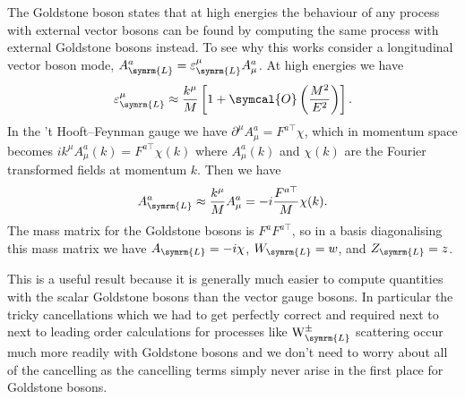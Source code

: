 \documentclass[fleqn]{NotesClass}
\newcommand{\Pparticle}[1]{\mathrm{#1}}
\newcommand{\PWpm}{\ensuremath{\Pparticle{W}^{\pm}}}
\newcommand{\order}{\symcal{O}}
\newcommand{\trans}{\top}
\begin{document}
    The Goldstone boson  states that at high energies the behaviour of any process with external vector bosons can be found by computing the same process with external Goldstone bosons instead.
    To see why this works consider a longitudinal vector boson mode, \(A^a_{\symrm{L}} = \varepsilon^\mu_{\symrm{L}} A^a_\mu\).
    At high energies we have 
    \begin{equation}
        \varepsilon^\mu_{\symrm{L}} \approx \frac{k^\mu}{M}\left[ 1 + \order\left( \frac{M^2}{E^2} \right) \right].
    \end{equation}
    In the 't Hooft--Feynman gauge we have \(\partial^\mu A^a_\mu = F^{a\trans}\chi\), which in momentum space becomes \(ik^\mu A^a_\mu(k) = F^{a\trans}\chi(k)\) where \(A^a_\mu(k)\) and \(\chi(k)\) are the Fourier transformed fields at momentum \(k\).
    Then we have
    \begin{equation}
        A^a_{\symrm{L}} \approx \frac{k^\mu}{M} A^a_\mu = -i\frac{F^{a\trans}}{M}\chi(k).
    \end{equation}
    The mass matrix for the Goldstone bosons is \(F^a F^{a\trans}\), so in a basis diagonalising this mass matrix we have \(A_{\symrm{L}} = -i\chi\), \(W_{\symrm{L}} = w\), and \(Z_{\symrm{L}} = z\).
    
    This is a useful result because it is generally much easier to compute quantities with the scalar Goldstone bosons than the vector gauge bosons.
    In particular the tricky cancellations which we had to get perfectly correct and required next to next to leading order calculations for processes like \(\PWpm_{\symrm{L}}\) scattering occur much more readily with Goldstone bosons and we don't need to worry about all of the cancelling as the cancelling terms simply never arise in the first place for Goldstone bosons.
    
\end{document}
